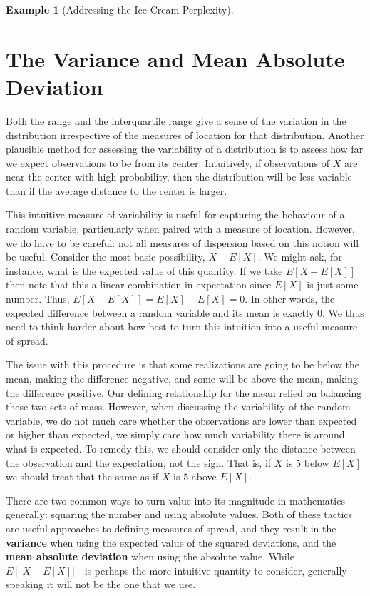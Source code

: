 \documentclass[
  letterpaper,
  DIV=11,
  numbers=noendperiod]{scrreprt}
\theoremstyle{definition}
\theoremstyle{definition}
\newtheorem{example}{Example}[chapter]
\theoremstyle{definition}
\theoremstyle{remark}
\begin{document}
\begin{example}[Addressing the Ice Cream
Perplexity]
\begin{tcolorbox}[enhanced jigsaw, colback=white, colframe=quarto-callout-color-frame, arc=.35mm, leftrule=.75mm, rightrule=.15mm, opacityback=0, breakable, bottomrule=.15mm, left=2mm, toprule=.15mm]
\end{tcolorbox}

\end{example}

\section{The Variance and Mean Absolute
Deviation}\label{the-variance-and-mean-absolute-deviation}

Both the range and the interquartile range give a sense of the variation
in the distribution irrespective of the measures of location for that
distribution. Another plausible method for assessing the variability of
a distribution is to assess how far we expect observations to be from
its center. Intuitively, if observations of \(X\) are near the center
with high probability, then the distribution will be less variable than
if the average distance to the center is larger.

This intuitive measure of variability is useful for capturing the
behaviour of a random variable, particularly when paired with a measure
of location. However, we do have to be careful: not all measures of
dispersion based on this notion will be useful. Consider the most basic
possibility, \(X - E[X]\). We might ask, for instance, what is the
expected value of this quantity. If we take \(E[X - E[X]]\) then note
that this a linear combination in expectation since \(E[X]\) is just
some number. Thus, \(E[X-E[X]] = E[X] - E[X] = 0\). In other words, the
expected difference between a random variable and its mean is exactly
\(0\). We thus need to think harder about how best to turn this
intuition into a useful measure of spread.

The issue with this procedure is that some realizations are going to be
below the mean, making the difference negative, and some will be above
the mean, making the difference positive. Our defining relationship for
the mean relied on balancing these two sets of mass. However, when
discussing the variability of the random variable, we do not much care
whether the observations are lower than expected or higher than
expected, we simply care how much variability there is around what is
expected. To remedy this, we should consider only the distance between
the observation and the expectation, not the sign. That is, if \(X\) is
\(5\) below \(E[X]\) we should treat that the same as if \(X\) is \(5\)
above \(E[X]\).

There are two common ways to turn value into its magnitude in
mathematics generally: squaring the number and using absolute values.
Both of these tactics are useful approaches to defining measures of
spread, and they result in the \textbf{variance} when using the expected
value of the squared deviations, and the \textbf{mean absolute
deviation} when using the absolute value. While \(E[|X-E[X]|]\) is
perhaps the more intuitive quantity to consider, generally speaking it
will not be the one that we use.
\end{document}
